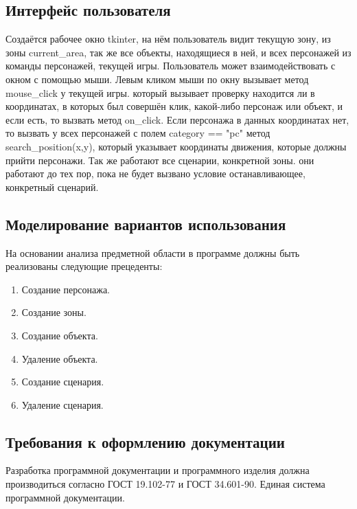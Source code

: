 \subsection{Интерфейс пользователя}
Создаётся рабочее окно tkinter, на нём пользователь видит текущую зону, из зоны current\_area, так же все объекты, находящиеся в ней, и всех персонажей из команды персонажей, текущей игры. Пользователь может взаимодействовать с окном с помощью мыши. Левым кликом мыши по окну вызывает метод mouse\_click у текущей игры. который вызывает проверку находится ли в координатах, в которых был совершён клик, какой-либо персонаж или объект, и если есть, то вызвать метод on\_click. Если персонажа в данных координатах нет, то вызвать у всех персонажей с полем category == "pc" метод search\_position(x,y), который указывает координаты движения, которые должны прийти персонажи. Так же работают все сценарии, конкретной зоны. они работают до тех пор, пока не будет вызвано условие останавливающее, конкретный сценарий.
\subsection{ Моделирование вариантов использования}
На основании анализа предметной области в программе должны быть реализованы следующие прецеденты:
\begin{enumerate}
\item Создание персонажа.
\item Создание зоны.
\item Создание объекта.
\item Удаление объекта.
\item Создание сценария.
\item Удаление сценария.
\end{enumerate}

\subsection{Требования к оформлению документации}

Разработка программной документации и программного изделия должна производиться согласно ГОСТ 19.102-77 и ГОСТ 34.601-90. Единая система программной документации.
